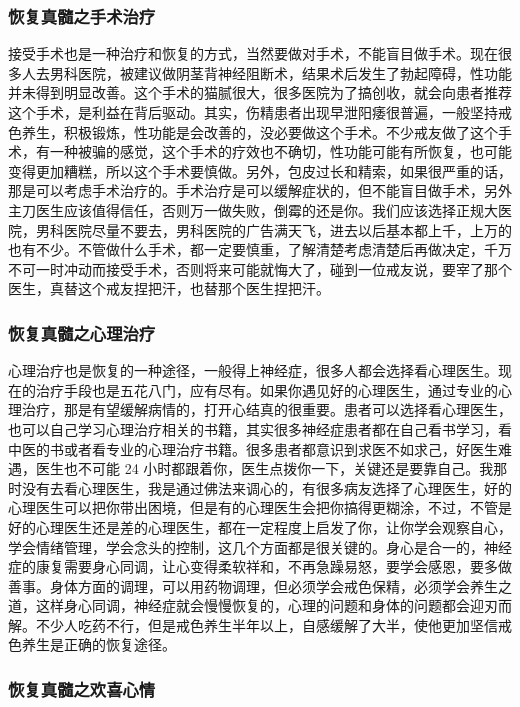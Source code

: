 \subsubsection{恢复真髓之手术治疗}

接受手术也是一种治疗和恢复的方式，当然要做对手术，不能盲目做手术。现在很多人去男科医院，被建议做阴茎背神经阻断术，结果术后发生了勃起障碍，性功能并未得到明显改善。这个手术的猫腻很大，很多医院为了搞创收，就会向患者推荐这个手术，是利益在背后驱动。其实，伤精患者出现早泄阳痿很普遍，一般坚持戒色养生，积极锻炼，性功能是会改善的，没必要做这个手术。不少戒友做了这个手术，有一种被骗的感觉，这个手术的疗效也不确切，性功能可能有所恢复，也可能变得更加糟糕，所以这个手术要慎做。另外，包皮过长和精索，如果很严重的话，那是可以考虑手术治疗的。手术治疗是可以缓解症状的，但不能盲目做手术，另外主刀医生应该值得信任，否则万一做失败，倒霉的还是你。我们应该选择正规大医院，男科医院尽量不要去，男科医院的广告满天飞，进去以后基本都上千，上万的也有不少。不管做什么手术，都一定要慎重，了解清楚考虑清楚后再做决定，千万不可一时冲动而接受手术，否则将来可能就悔大了，碰到一位戒友说，要宰了那个医生，真替这个戒友捏把汗，也替那个医生捏把汗。

\subsubsection{恢复真髓之心理治疗}

心理治疗也是恢复的一种途径，一般得上神经症，很多人都会选择看心理医生。现在的治疗手段也是五花八门，应有尽有。如果你遇见好的心理医生，通过专业的心理治疗，那是有望缓解病情的，打开心结真的很重要。患者可以选择看心理医生，也可以自己学习心理治疗相关的书籍，其实很多神经症患者都在自己看书学习，看中医的书或者看专业的心理治疗书籍。很多患者都意识到求医不如求己，好医生难遇，医生也不可能 24 小时都跟着你，医生点拨你一下，关键还是要靠自己。我那时没有去看心理医生，我是通过佛法来调心的，有很多病友选择了心理医生，好的心理医生可以把你带出困境，但是有的心理医生会把你搞得更糊涂，不过，不管是好的心理医生还是差的心理医生，都在一定程度上启发了你，让你学会观察自心，学会情绪管理，学会念头的控制，这几个方面都是很关键的。身心是合一的，神经症的康复需要身心同调，让心变得柔软祥和，不再急躁易怒，要学会感恩，要多做善事。身体方面的调理，可以用药物调理，但必须学会戒色保精，必须学会养生之道，这样身心同调，神经症就会慢慢恢复的，心理的问题和身体的问题都会迎刃而解。不少人吃药不行，但是戒色养生半年以上，自感缓解了大半，使他更加坚信戒色养生是正确的恢复途径。

\subsubsection{恢复真髓之欢喜心情}

